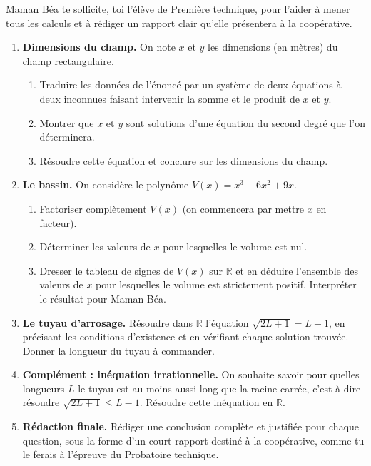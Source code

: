 \documentclass[11pt]{article}
\newcounter{popsec}
\newcounter{popsub}
\newcommand{\courssub}[1]{%
  \stepcounter{popsub}%
  \par\vspace{9pt}\noindent{\popxbold\fontsize{11.5}{13}\selectfont\color{popink}{\color{poporange}\thepopsec.\thepopsub}\hspace{6pt}#1}\par\nopagebreak\vspace{4pt}
}
\begin{document}
Maman Béa te sollicite, toi l'élève de Première technique, pour l'aider à mener tous les calculs et à rédiger un rapport clair qu'elle présentera à la coopérative.

\courssub{Consignes}

\begin{enumerate}
\item \textbf{Dimensions du champ.} On note $x$ et $y$ les dimensions (en mètres) du champ rectangulaire.
\begin{enumerate}
\item Traduire les données de l'énoncé par un système de deux équations à deux inconnues faisant intervenir la somme et le produit de $x$ et $y$.
\item Montrer que $x$ et $y$ sont solutions d'une équation du second degré que l'on déterminera.
\item Résoudre cette équation et conclure sur les dimensions du champ.
\end{enumerate}
\item \textbf{Le bassin.} On considère le polynôme $V(x) = x^3 - 6x^2 + 9x$.
\begin{enumerate}
\item Factoriser complètement $V(x)$ (on commencera par mettre $x$ en facteur).
\item Déterminer les valeurs de $x$ pour lesquelles le volume est nul.
\item Dresser le tableau de signes de $V(x)$ sur $\mathbb{R}$ et en déduire l'ensemble des valeurs de $x$ pour lesquelles le volume est strictement positif. Interpréter le résultat pour Maman Béa.
\end{enumerate}
\item \textbf{Le tuyau d'arrosage.} Résoudre dans $\mathbb{R}$ l'équation $\sqrt{2L+1} = L - 1$, en précisant les conditions d'existence et en vérifiant chaque solution trouvée. Donner la longueur du tuyau à commander.
\item \textbf{Complément : inéquation irrationnelle.} On souhaite savoir pour quelles longueurs $L$ le tuyau est au moins aussi long que la racine carrée, c'est-à-dire résoudre $\sqrt{2L+1} \leq L - 1$. Résoudre cette inéquation en $\mathbb{R}$.
\item \textbf{Rédaction finale.} Rédiger une conclusion complète et justifiée pour chaque question, sous la forme d'un court rapport destiné à la coopérative, comme tu le ferais à l'épreuve du Probatoire technique.
\end{enumerate}
\end{document}

